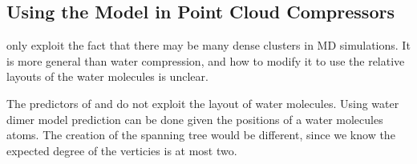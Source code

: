 \documentclass[a4paper]{report}
\begin{document}
\subsection{Using the Model in Point Cloud Compressors}

\citet{omeltchenko2000sls} only exploit the fact that there may be many dense
clusters in MD simulations. It is more general than water compression, and how
to modify it to use the relative layouts of the water molecules is unclear.

The predictors of \citet{merrycomp} and \citet{gumholdcomp} do not exploit the
layout of water molecules. Using water dimer model prediction can be done
given the positions of a water molecules atoms. The creation of the spanning
tree would be different, since we know the expected degree of the verticies is
at most two.
\end{document}
